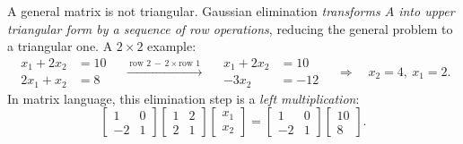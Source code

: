 A general matrix is not triangular. Gaussian elimination \emph{transforms $A$ into upper triangular form by a sequence of row operations}, reducing the general problem to a triangular one. A $2 \times 2$ example:
\begin{equation}
  \begin{aligned} x_1 + 2x_2 &= 10 \\ 2x_1 + x_2 &= 8 \end{aligned}
  \quad \xrightarrow{\ \text{row 2} \,-\, 2 \times \text{row 1}\ } \quad
  \begin{aligned} x_1 + 2x_2 &= 10 \\ -3x_2 &= -12 \end{aligned}
  \quad \Longrightarrow \quad x_2 = 4,\ x_1 = 2.
\end{equation}
In matrix language, this elimination step is a \emph{left multiplication}:
\begin{equation}
  \begin{bmatrix} 1 & 0 \\ -2 & 1 \end{bmatrix}
  \begin{bmatrix} 1 & 2 \\ 2 & 1 \end{bmatrix}
  \begin{bmatrix} x_1 \\ x_2 \end{bmatrix}
  =
  \begin{bmatrix} 1 & 0 \\ -2 & 1 \end{bmatrix}
  \begin{bmatrix} 10 \\ 8 \end{bmatrix}.
\end{equation}

